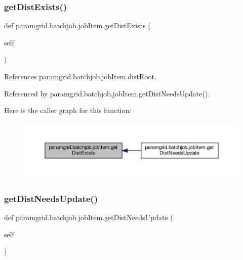 \subsubsection{\texorpdfstring{get\+Dist\+Exists()}{getDistExists()}}
{\footnotesize\ttfamily def paramgrid.\+batchjob.\+job\+Item.\+get\+Dist\+Exists (\begin{DoxyParamCaption}\item[{}]{self }\end{DoxyParamCaption})}



References paramgrid.\+batchjob.\+job\+Item.\+dist\+Root.



Referenced by paramgrid.\+batchjob.\+job\+Item.\+get\+Dist\+Needs\+Update().

Here is the caller graph for this function\+:
\nopagebreak
\begin{figure}[H]
\begin{center}
\leavevmode
\includegraphics[width=350pt]{classparamgrid_1_1batchjob_1_1jobItem_aaee158d49404d612429bb2b9fbc9f5cf_icgraph}
\end{center}
\end{figure}
\mbox{\label{classparamgrid_1_1batchjob_1_1jobItem_a34d9ff5d01cecc89dcd1ce1a2d71a63e}} 
\subsubsection{\texorpdfstring{get\+Dist\+Needs\+Update()}{getDistNeedsUpdate()}}
{\footnotesize\ttfamily def paramgrid.\+batchjob.\+job\+Item.\+get\+Dist\+Needs\+Update (\begin{DoxyParamCaption}\item[{}]{self }\end{DoxyParamCaption})}



